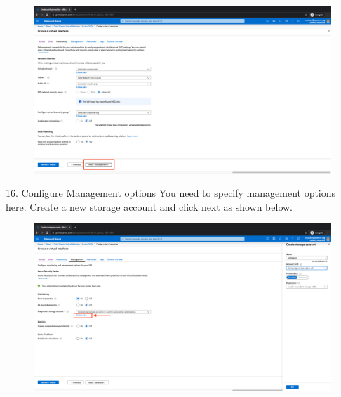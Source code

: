 \begin{figure}[H]
\begin{center} 
\includegraphics[scale=0.20]{figures/vm18}
\end{center}
\end{figure}

16. Configure Management options
You need to specify management options here. Create a new storage account and click next as shown below.

\begin{figure}[H]
\begin{center} 
\includegraphics[scale=0.20]{figures/vm19}
\end{center}
\end{figure}

